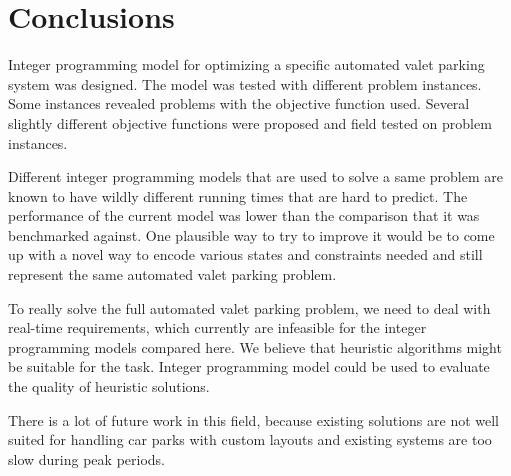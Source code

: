 \section{Conclusions}
Integer programming model for optimizing a specific automated valet parking
system was designed. The model was tested with different problem instances. Some
instances revealed problems with the objective function used. Several slightly
different objective functions were proposed and field tested on problem
instances.

Different integer programming models that are used to solve a same problem are
known to have wildly different running times that are hard to predict. The
performance of the current model was lower than the comparison that it was
benchmarked against. One plausible way to try to improve it would be to come up
with a novel way to encode various states and constraints needed and still
represent the same automated valet parking problem.

To really solve the full automated valet parking problem, we need to deal with
real-time requirements, which currently are infeasible for the integer
programming models compared here. We believe that heuristic algorithms might be
suitable for the task. Integer programming model could be used to evaluate the
quality of heuristic solutions.

There is a lot of future work in this field, because existing solutions are not
well suited for handling car parks with custom layouts and existing systems are
too slow during peak periods.
